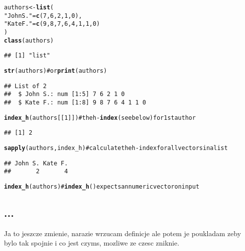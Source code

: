 \documentclass[11pt]{article}\usepackage{graphicx, color}
\makeatletter
\newcommand{\hlfunctioncall}[1]{\textcolor[rgb]{0.501960784313725,0,0.329411764705882}{\textbf{#1}}}%
\newcommand{\hlstring}[1]{\textcolor[rgb]{0.6,0.6,1}{#1}}%
\newcommand{\hlcomment}[1]{\textcolor[rgb]{0.180392156862745,0.6,0.341176470588235}{#1}}%
\newenvironment{kframe}{%
 \def\at@end@of@kframe{}%
 \ifinner\ifhmode%
  \def\at@end@of@kframe{\end{minipage}}%
  \begin{minipage}{\columnwidth}%
 \fi\fi%
 \def\FrameCommand##1{\hskip\@totalleftmargin \hskip-\fboxsep
 \colorbox{shadecolor}{##1}\hskip-\fboxsep
     \hskip-\linewidth \hskip-\@totalleftmargin \hskip\columnwidth}%
 \MakeFramed {\advance\hsize-\width
   \@totalleftmargin\z@ \linewidth\hsize
   \@setminipage}}%
 {\par\unskip\endMakeFramed%
 \at@end@of@kframe}
\newenvironment{knitrout}{}{} %
\theoremstyle{remark}
\theoremstyle{definition}
\makeatother
\begin{document}
\begin{knitrout}\small
{}\color{fgcolor}\begin{kframe}
\begin{alltt}
authors <- \hlfunctioncall{list}(
   \hlstring{"John S."} = \hlfunctioncall{c}(7,6,2,1,0),
   \hlstring{"Kate F."} = \hlfunctioncall{c}(9,8,7,6,4,1,1,0)
)
\hlfunctioncall{class}(authors)
\end{alltt}
\begin{verbatim}
## [1] "list"
\end{verbatim}
\begin{alltt}
\hlfunctioncall{str}(authors)   \hlcomment{# or \hlfunctioncall{print}(authors)}
\end{alltt}
\begin{verbatim}
## List of 2
##  $ John S.: num [1:5] 7 6 2 1 0
##  $ Kate F.: num [1:8] 9 8 7 6 4 1 1 0
\end{verbatim}
\begin{alltt}
\hlfunctioncall{index_h}(authors[[1]]) \hlcomment{# the h-\hlfunctioncall{index} (see below) for 1st author}
\end{alltt}
\begin{verbatim}
## [1] 2
\end{verbatim}
\begin{alltt}
\hlfunctioncall{sapply}(authors, index_h) \hlcomment{# calculate the h-index for all vectors in a list}
\end{alltt}
\begin{verbatim}
## John S. Kate F. 
##       2       4
\end{verbatim}
\begin{alltt}
\hlfunctioncall{index_h}(authors) \hlcomment{# \hlfunctioncall{index_h}() expects an numeric vector on input}
\end{alltt}


{\ttfamily\noindent\bfseries\color{errorcolor}{\#\# Error: argument `x` should be a numeric vector (or an object coercible to)}}\end{kframe}
\end{knitrout}




\subsection{...}

Ja to jeszcze zmienie, narazie wrzucam definicje ale potem je poukladam zeby bylo tak spojnie 
i co jest czyms, mozliwe ze czesc zniknie.
\end{document}
